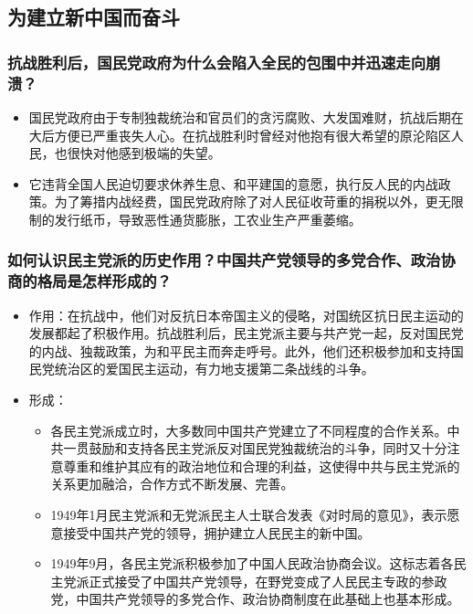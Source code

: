 \documentclass{article}
\begin{document}
\subsection{为建立新中国而奋斗}

\subsubsection{抗战胜利后，国民党政府为什么会陷入全民的包围中并迅速走向崩溃？}
\begin{itemize}
    \item 国民党政府由于专制独裁统治和官员们的贪污腐败、大发国难财，抗战后期在大后方便已严重丧失人心。在抗战胜利时曾经对他抱有很大希望的原沦陷区人民，也很快对他感到极端的失望。
    \item 它违背全国人民迫切要求休养生息、和平建国的意愿，执行反人民的内战政策。为了筹措内战经费，国民党政府除了对人民征收苛重的捐税以外，更无限制的发行纸币，导致恶性通货膨胀，工农业生产严重萎缩。
\end{itemize}

\subsubsection{如何认识民主党派的历史作用？中国共产党领导的多党合作、政治协商的格局是怎样形成的？}
\begin{itemize}
    \item 作用：在抗战中，他们对反抗日本帝国主义的侵略，对国统区抗日民主运动的发展都起了积极作用。抗战胜利后，民主党派主要与共产党一起，反对国民党的内战、独裁政策，为和平民主而奔走呼号。此外，他们还积极参加和支持国民党统治区的爱国民主运动，有力地支援第二条战线的斗争。
    \item 形成：
    \begin{itemize}
        \item 各民主党派成立时，大多数同中国共产党建立了不同程度的合作关系。中共一贯鼓励和支持各民主党派反对国民党独裁统治的斗争，同时又十分注意尊重和维护其应有的政治地位和合理的利益，这使得中共与民主党派的关系更加融洽，合作方式不断发展、完善。
        \item 1949年1月民主党派和无党派民主人士联合发表《对时局的意见》，表示愿意接受中国共产党的领导，拥护建立人民民主的新中国。
        \item 1949年9月，各民主党派积极参加了中国人民政治协商会议。这标志着各民主党派正式接受了中国共产党领导，在野党变成了人民民主专政的参政党，中国共产党领导的多党合作、政治协商制度在此基础上也基本形成。
    \end{itemize}
\end{itemize}
\end{document}
